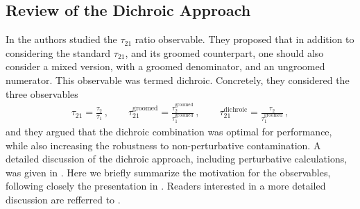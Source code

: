 \documentclass[11pt,letterpaper]{article}
\newcommand{\groomed}{\text{groomed}}
\begin{document}

\subsection{Review of the Dichroic Approach}\label{sec:dichroic}


In \cite{Salam:2016yht} the authors studied the $\tau_{21}$ ratio observable. They proposed that in addition to considering the standard $\tau_{21}$, and its groomed counterpart, one should also consider a mixed version, with a groomed denominator, and an ungroomed numerator. This observable was termed dichroic. Concretely, they considered the three observables
\begin{align}
 \tau_{21} =\frac{\tau_2}{\tau_1}  \,, \qquad \tau_{21}^{\text{groomed}} =\frac{\tau_2^\groomed}{\tau_1^\groomed}\,, \qquad \tau_{21}^{\text{dichroic}} =\frac{\tau_2}{\tau_1^\groomed}\,,
\end{align}
and they argued that the dichroic combination was optimal for performance, while also increasing the robustness to non-perturbative contamination. A detailed discussion of the dichroic approach, including perturbative calculations, was given in \cite{Salam:2016yht}. Here we briefly summarize the motivation for the observables, following closely the presentation in \cite{Salam:2016yht}. Readers interested in a more detailed discussion are refferred to \cite{Salam:2016yht}.
\end{document}

